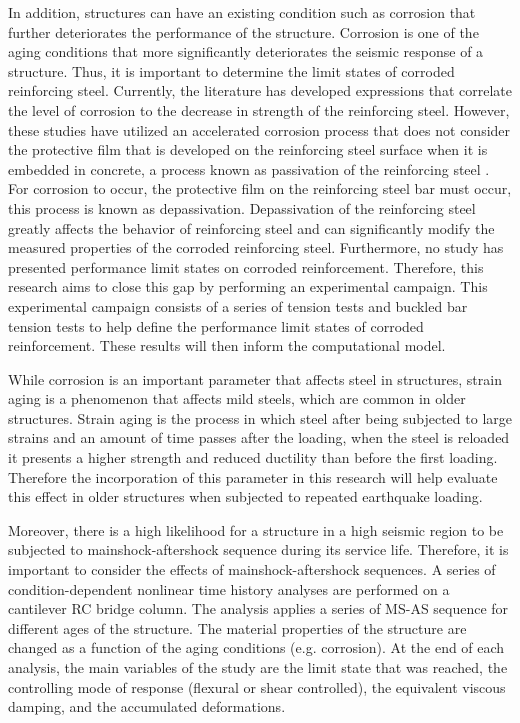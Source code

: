 In addition, structures can have an existing condition such as corrosion that further deteriorates the performance of the structure. Corrosion is one of the aging conditions that more significantly deteriorates the seismic response of a structure. Thus, it is important to determine the limit states of corroded reinforcing steel. Currently, the literature has developed expressions that correlate the level of corrosion to the decrease in strength of the reinforcing steel\cite{Yuan2017a}\cite{Du2005}. However, these studies have utilized an accelerated corrosion process that does not consider the protective film that is developed on the reinforcing steel surface when it is embedded in concrete, a process known as passivation of the reinforcing steel \cite{Mehta2014}\cite{Ghods2009}. For corrosion to occur, the protective film on the reinforcing steel bar must occur, this process is known as  depassivation. Depassivation of the reinforcing steel greatly affects the behavior of reinforcing steel and can significantly modify the measured properties of the corroded reinforcing steel. Furthermore, no study has presented performance limit states on corroded reinforcement. Therefore, this research aims to close this gap by performing an experimental campaign. This experimental campaign consists of a series of tension tests and buckled bar tension tests to help define the performance limit states of corroded reinforcement. These results will then inform the computational model.

While corrosion is an important parameter that affects steel in structures, strain aging is a phenomenon that affects mild steels, which are common in older structures. Strain aging is the process in which steel after being subjected to large strains and an amount of time passes after the loading, when the steel is reloaded it presents a higher strength and reduced ductility than before the first loading. Therefore the incorporation of this parameter in this research will help evaluate this effect in older structures when subjected to repeated earthquake loading.

Moreover, there is a high likelihood for a structure in a high seismic region to be subjected to mainshock-aftershock sequence during its service life. Therefore, it is important to consider the effects of mainshock-aftershock sequences. A series of condition-dependent nonlinear time history analyses are performed on a cantilever RC bridge column. The analysis applies a series of MS-AS sequence for different ages of the structure. The material properties of the structure are changed as a function of the aging conditions (e.g. corrosion). At the end of each analysis, the main variables of the study are the limit state that was reached, the controlling mode of response (flexural or shear controlled), the equivalent viscous damping, and the accumulated deformations.

